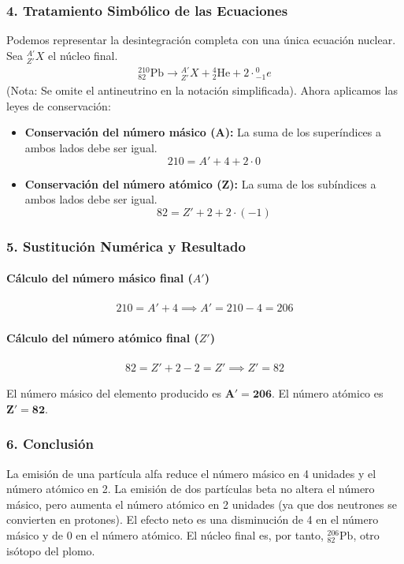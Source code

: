 \subsubsection*{4. Tratamiento Simbólico de las Ecuaciones}
Podemos representar la desintegración completa con una única ecuación nuclear. Sea ${}_{Z'}^{A'}X$ el núcleo final.
\begin{gather}
    {}_{82}^{210}\text{Pb} \longrightarrow {}_{Z'}^{A'}X + {}_{2}^{4}\text{He} + 2 \cdot {}_{-1}^{0}e
\end{gather}
(Nota: Se omite el antineutrino en la notación simplificada).
Ahora aplicamos las leyes de conservación:
\begin{itemize}
    \item \textbf{Conservación del número másico (A):} La suma de los superíndices a ambos lados debe ser igual.
    $$ 210 = A' + 4 + 2 \cdot 0 $$
    \item \textbf{Conservación del número atómico (Z):} La suma de los subíndices a ambos lados debe ser igual.
    $$ 82 = Z' + 2 + 2 \cdot (-1) $$
\end{itemize}

\subsubsection*{5. Sustitución Numérica y Resultado}
\paragraph{Cálculo del número másico final ($A'$)}
\begin{gather}
    210 = A' + 4 \implies A' = 210 - 4 = 206
\end{gather}

\paragraph{Cálculo del número atómico final ($Z'$)}
\begin{gather}
    82 = Z' + 2 - 2 = Z' \implies Z' = 82
\end{gather}
\begin{cajaresultado}
El número másico del elemento producido es $\boldsymbol{A' = 206}$. El número atómico es $\boldsymbol{Z' = 82}$.
\end{cajaresultado}

\subsubsection*{6. Conclusión}
\begin{cajaconclusion}
La emisión de una partícula alfa reduce el número másico en 4 unidades y el número atómico en 2. La emisión de dos partículas beta no altera el número másico, pero aumenta el número atómico en 2 unidades (ya que dos neutrones se convierten en protones). El efecto neto es una disminución de 4 en el número másico y de 0 en el número atómico. El núcleo final es, por tanto, ${}_{82}^{206}\text{Pb}$, otro isótopo del plomo.
\end{cajaconclusion}

